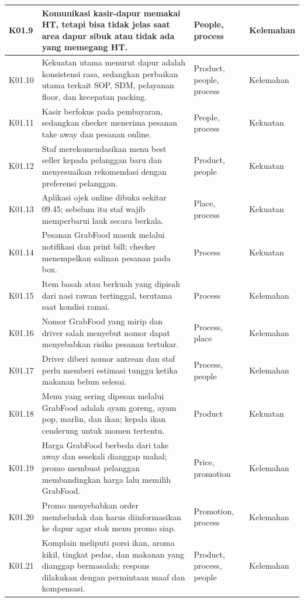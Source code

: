 \begin{xltabular}{\textwidth}{|C{1.0cm}|Y|L{2.6cm}|L{2.0cm}|}
K01.9 & Komunikasi kasir-dapur memakai HT, tetapi bisa tidak jelas saat area dapur sibuk atau tidak ada yang memegang HT. & People, process & Kelemahan \\ \hline
K01.10 & Kekuatan utama menurut dapur adalah konsistensi rasa, sedangkan perbaikan utama terkait SOP, SDM, pelayanan floor, dan kecepatan packing. & Product, people, process & Kelemahan \\ \hline
K01.11 & Kasir berfokus pada pembayaran, sedangkan checker menerima pesanan take away dan pesanan online. & People, process & Kekuatan \\ \hline
K01.12 & Staf merekomendasikan menu best seller kepada pelanggan baru dan menyesuaikan rekomendasi dengan preferensi pelanggan. & Product, people & Kekuatan \\ \hline
K01.13 & Aplikasi ojek online dibuka sekitar 09.45; sebelum itu staf wajib memperbarui lauk secara berkala. & Place, process & Kekuatan \\ \hline
K01.14 & Pesanan GrabFood masuk melalui notifikasi dan print bill; checker menempelkan salinan pesanan pada box. & Process & Kekuatan \\ \hline
K01.15 & Item basah atau berkuah yang dipisah dari nasi rawan tertinggal, terutama saat kondisi ramai. & Process & Kelemahan \\ \hline
K01.16 & Nomor GrabFood yang mirip dan driver salah menyebut nomor dapat menyebabkan risiko pesanan tertukar. & Process, place & Kelemahan \\ \hline
K01.17 & Driver diberi nomor antrean dan staf perlu memberi estimasi tunggu ketika makanan belum selesai. & Process, people & Kelemahan \\ \hline
K01.18 & Menu yang sering dipesan melalui GrabFood adalah ayam goreng, ayam pop, marlin, dan ikan; kepala ikan cenderung untuk momen tertentu. & Product & Kekuatan \\ \hline
K01.19 & Harga GrabFood berbeda dari take away dan sesekali dianggap mahal; promo membuat pelanggan membandingkan harga lalu memilih GrabFood. & Price, promotion & Kelemahan \\ \hline
K01.20 & Promo menyebabkan order membeludak dan harus diinformasikan ke dapur agar stok menu promo siap. & Promotion, process & Kelemahan \\ \hline
K01.21 & Komplain meliputi porsi ikan, aroma kikil, tingkat pedas, dan makanan yang dianggap bermasalah; respons dilakukan dengan permintaan maaf dan kompensasi. & Product, process, people & Kelemahan \\ \hline

\end{xltabular}
